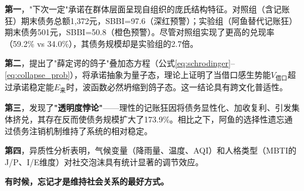 \documentclass[journal]{IEEEtran}
\begin{document}
\textbf{第一}，"下次一定"承诺在群体层面呈现自组织的庞氏结构特征。对照组（含记账狂）期末债务总额1,372元，SBBI=97.6（深红预警）；实验组（阿鱼替代记账狂）期末债务501元，SBBI=50.8（橙色预警）。尽管对照组实现了更高的兑现率（59.2\% vs 34.0\%），其债务规模却是实验组的2.7倍。

\textbf{第二}，提出了"薛定谔的鸽子"叠加态方程（公式\ref{eq:schrodinger}–\ref{eq:collapse_prob}），将承诺抽象为量子态，理论上证明了当借口感生势能$V_{\text{借口}}$超过承诺稳定能$E_{\text{来}}$时，波函数必然坍缩到鸽子态。这一结论具有跨文化普适性。

\textbf{第三}，发现了\textbf{"透明度悖论"}——理性的记账狂因将债务显性化、加收复利、引发集体挤兑，其存在反而使债务规模扩大了173.9\%。相比之下，阿鱼的选择性遗忘通过债务注销机制维持了系统的相对稳定。

\textbf{第四}，异质性分析表明，气候变量（降雨量、温度、AQI）和人格类型（MBTI的J/P、I/E维度）对社交泡沫具有统计显著的调节效应。

\textbf{有时候，忘记才是维持社会关系的最好方式。}
\end{document}
